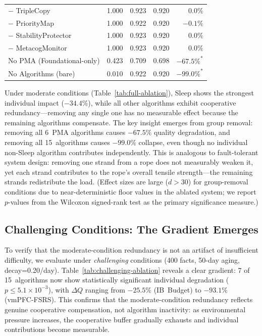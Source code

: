 \documentclass{article}
\begin{document}
\begin{table}[h]
\begin{tabular}{lcccr}
        $-$ TripleCopy & 1.000 & 0.923 & 0.920 & $0.0\%$ \\
        $-$ PriorityMap & 1.000 & 0.922 & 0.920 & $-0.1\%$ \\
        $-$ StabilityProtector & 1.000 & 0.923 & 0.920 & $0.0\%$ \\
        $-$ MetacogMonitor & 1.000 & 0.923 & 0.920 & $0.0\%$ \\
        \midrule
        No PMA (Foundational-only) & 0.423 & 0.709 & 0.698 & $-67.5\%^\ast$ \\
        No Algorithms (bare) & 0.010 & 0.922 & 0.920 & $-99.0\%^\ast$ \\
        \bottomrule
    \end{tabular}
\end{table}

Under moderate conditions (Table~\ref{tab:full-ablation}), Sleep shows
the strongest individual impact ($-34.4\%$), while all other algorithms
exhibit cooperative redundancy---removing any single one has no measurable
effect because the remaining algorithms compensate.
The key insight emerges from group removal:
removing all 6~PMA algorithms causes $-67.5\%$ quality degradation,
and removing all 15~algorithms causes $-99.0\%$ collapse,
even though no individual non-Sleep algorithm contributes independently.
This is analogous to fault-tolerant system design: removing one strand
from a rope does not measurably weaken it, yet each strand contributes
to the rope's overall tensile strength---the remaining strands redistribute
the load.
(Effect sizes are large ($d > 30$) for group-removal conditions
due to near-deterministic floor values in the ablated system;
we report $p$-values from the Wilcoxon signed-rank test as the
primary significance measure.)

\subsection{Challenging Conditions: The Gradient Emerges}

To verify that the moderate-condition redundancy is not an artifact of
insufficient difficulty, we evaluate under \emph{challenging} conditions
(400 facts, 50-day aging, decay=0.20/day).
Table~\ref{tab:challenging-ablation} reveals a clear gradient:
7 of 15~algorithms now show statistically significant individual
degradation ($p \le 5.1\times 10^{-3}$), with $\Delta Q$ ranging from $-25.5\%$
(IB~Budget) to $-93.1\%$ (vmPFC-FSRS).
This confirms that the moderate-condition redundancy reflects genuine
cooperative compensation, not algorithm inactivity: as environmental
pressure increases, the cooperative buffer gradually exhausts and
individual contributions become measurable.
\end{document}
